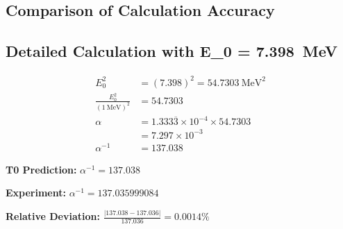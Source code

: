 	\subsection{Comparison of Calculation Accuracy}
	
	\begin{table}[h]
		\centering
		\caption{Comparison of calculation accuracy for different E\_0 values}
	\end{table}
	
	\subsection{Detailed Calculation with E\_0 = \SI{7.398}{\MeV}}
	
	\begin{align}
		E_0^2 &= (7.398)^2 = \SI{54.7303}{\MeV\squared} \\
		\frac{E_0^2}{( \SI{1}{\MeV} )^2} &= 54.7303 \\
		\alpha &= 1.333\overline{3} \times 10^{-4} \times 54.7303 \\
		&= 7.297 \times 10^{-3} \\
		\alpha^{-1} &= 137.038
	\end{align}
	
	\begin{tcolorbox}[colback=green!5!white,colframe=green!75!black,title=Excellent Agreement]
		\textbf{T0 Prediction:} $\alpha^{-1} = 137.038$
		
		\textbf{Experiment:} $\alpha^{-1} = 137.035999084$
		
		\textbf{Relative Deviation:} $\frac{|137.038 - 137.036|}{137.036} = 0.0014\%$
	\end{tcolorbox}
	
